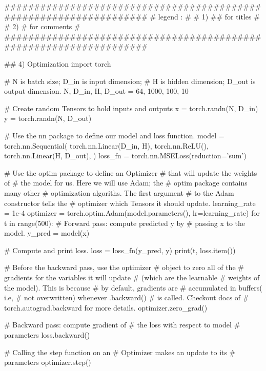 \documentclass[11pt]{article}
\begin{document}
\begin{python}
###################################################################
# legend :                                                        #
#         1) ## for titles                                        #
#         2) #  for comments                                      #
###################################################################   

## 4) Optimization
import torch

# N is batch size; D_in is input dimension;
# H is hidden dimension; D_out is output dimension.
N, D_in, H, D_out = 64, 1000, 100, 10

# Create random Tensors to hold inputs and outputs
x = torch.randn(N, D_in)
y = torch.randn(N, D_out)

# Use the nn package to define our model and loss function.
model = torch.nn.Sequential(
    torch.nn.Linear(D_in, H),
    torch.nn.ReLU(),
    torch.nn.Linear(H, D_out),
)
loss_fn = torch.nn.MSELoss(reduction='sum')

# Use the optim package to define an Optimizer
# that will update the weights of
# the model for us. Here we will use Adam; the
# optim package contains many other
# optimization algoriths. The first argument
# to the Adam constructor tells the
# optimizer which Tensors it should update.
learning_rate = 1e-4
optimizer = torch.optim.Adam(model.parameters(),
                             lr=learning_rate)
for t in range(500):
    # Forward pass: compute predicted y by
    # passing x to the model.
    y_pred = model(x)

    # Compute and print loss.
    loss = loss_fn(y_pred, y)
    print(t, loss.item())

    # Before the backward pass, use the optimizer
    # object to zero all of the
    # gradients for the variables it will update
    # (which are the learnable
    # weights of the model). This is because
    # by default, gradients are
    # accumulated in buffers( i.e,
    # not overwritten) whenever .backward()
    # is called. Checkout docs of
    # torch.autograd.backward for more details.
    optimizer.zero_grad()

    # Backward pass: compute gradient of
    # the loss with respect to model
    # parameters
    loss.backward()

    # Calling the step function on an
    # Optimizer makes an update to its
    # parameters
    optimizer.step()
\end{python}{}
\clearpage
\end{document}
